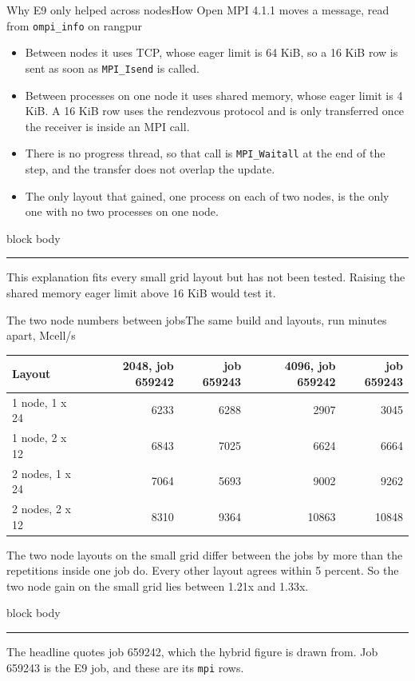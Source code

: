\documentclass[aspectratio=169,11pt]{beamer}
\newcommand{\twoNodeGain}{1.21}
\newcommand{\sigcallout}[1]{%
  \vfill
  \begin{beamercolorbox}[wd=0.74\linewidth,sep=0.55em,rounded=true]{block body}
    \small{\color{sigblue}\rule{0.9ex}{0.9ex}}\hspace{0.5em}#1
  \end{beamercolorbox}%
}
\newcommand{\sigtable}[3]{%
  \begingroup
  \renewcommand{\arraystretch}{1.12}%
  \begin{table}\small
    \begin{tabular}{#1}
      \toprule
      #2 \\
      \midrule
      #3
      \bottomrule
    \end{tabular}
  \end{table}%
  \endgroup
}
\begin{document}
\begin{frame}{Why E9 only helped across nodes}{How Open MPI 4.1.1 moves a message, read from \texttt{ompi\_info} on rangpur}
  {\small
  \begin{itemize}
    \item Between nodes it uses TCP, whose eager limit is 64 KiB, so a 16 KiB row is sent as soon as \texttt{MPI\_Isend} is called.
    \item Between processes on one node it uses shared memory, whose eager limit is 4 KiB. A 16 KiB row uses the rendezvous protocol and is only transferred once the receiver is inside an MPI call.
    \item There is no progress thread, so that call is \texttt{MPI\_Waitall} at the end of the step, and the transfer does not overlap the update.
    \item The only layout that gained, one process on each of two nodes, is the only one with no two processes on one node.
  \end{itemize}}
  \sigcallout{This explanation fits every small grid layout but has not been
    tested. Raising the shared memory eager limit above 16 KiB would test it.}
\end{frame}

\begin{frame}{The two node numbers between jobs}{The same build and layouts, run minutes apart, Mcell/s}
  \sigtable{lrrrr}{\textbf{Layout} & \textbf{2048, job 659242} & \textbf{job 659243} & \textbf{4096, job 659242} & \textbf{job 659243}}{%
    1 node, 1 x 24 & 6233 & 6288 & 2907 & 3045 \\
    1 node, 2 x 12 & 6843 & 7025 & 6624 & 6664 \\
    2 nodes, 1 x 24 & 7064 & 5693 & 9002 & 9262 \\
    2 nodes, 2 x 12 & 8310 & 9364 & 10863 & 10848 \\}
  {\small The two node layouts on the small grid differ between the jobs by
  more than the repetitions inside one job do. Every other layout agrees
  within 5 percent. So the two node gain on the small grid lies between
  \twoNodeGain x and 1.33x.}
  \sigcallout{The headline quotes job 659242, which the hybrid figure is
    drawn from. Job 659243 is the E9 job, and these are its \texttt{mpi} rows.}
\end{frame}
\end{document}

